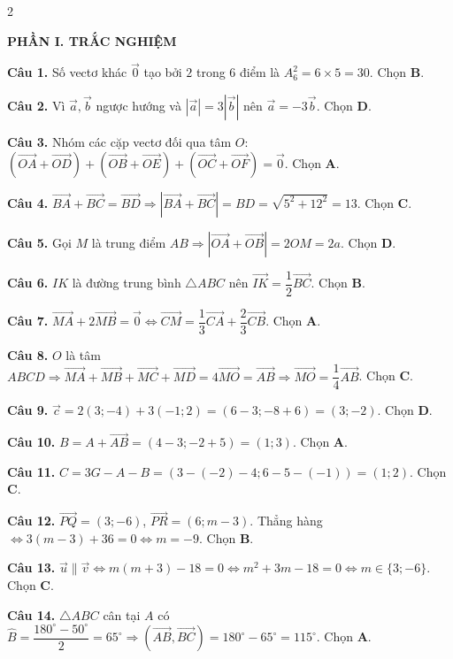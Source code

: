 \documentclass[10pt,a4paper]{article}
\begin{document}
\begin{multicols}{2}
\raggedcolumns
\small
{}

\textbf{\color{accent}\textsf{PHẦN I. TRẮC NGHIỆM}}

\textbf{Câu 1.} Số vectơ khác $\vec{0}$ tạo bởi $2$ trong $6$ điểm là $A_6^2 = 6 \times 5 = 30$. Chọn \textbf{B}.

\textbf{Câu 2.} Vì $\vec{a}, \vec{b}$ ngược hướng và $|\vec{a}| = 3|\vec{b}|$ nên $\vec{a} = -3\vec{b}$. Chọn \textbf{D}.

\textbf{Câu 3.} Nhóm các cặp vectơ đối qua tâm $O$: $(\vec{OA} + \vec{OD}) + (\vec{OB} + \vec{OE}) + (\vec{OC} + \vec{OF}) = \vec{0}$. Chọn \textbf{A}.

\textbf{Câu 4.} $\vec{BA} + \vec{BC} = \vec{BD} \Rightarrow |\vec{BA} + \vec{BC}| = BD = \sqrt{5^2 + 12^2} = 13$. Chọn \textbf{C}.

\textbf{Câu 5.} Gọi $M$ là trung điểm $AB \Rightarrow |\vec{OA} + \vec{OB}| = 2OM = 2a$. Chọn \textbf{D}.

\textbf{Câu 6.} $IK$ là đường trung bình $\triangle ABC$ nên $\vec{IK} = \dfrac{1}{2}\vec{BC}$. Chọn \textbf{B}.

\textbf{Câu 7.} $\vec{MA} + 2\vec{MB} = \vec{0} \Leftrightarrow \vec{CM} = \dfrac{1}{3}\vec{CA} + \dfrac{2}{3}\vec{CB}$. Chọn \textbf{A}.

\textbf{Câu 8.} $O$ là tâm $ABCD \Rightarrow \vec{MA} + \vec{MB} + \vec{MC} + \vec{MD} = 4\vec{MO} = \vec{AB} \Rightarrow \vec{MO} = \dfrac{1}{4}\vec{AB}$. Chọn \textbf{C}.

\textbf{Câu 9.} $\vec{c} = 2(3; -4) + 3(-1; 2) = (6 - 3; -8 + 6) = (3; -2)$. Chọn \textbf{D}.

\textbf{Câu 10.} $B = A + \vec{AB} = (4 - 3; -2 + 5) = (1; 3)$. Chọn \textbf{A}.

\textbf{Câu 11.} $C = 3G - A - B = (3 - (-2) - 4; 6 - 5 - (-1)) = (1; 2)$. Chọn \textbf{C}.

\textbf{Câu 12.} $\vec{PQ} = (3; -6)$, $\vec{PR} = (6; m - 3)$. Thẳng hàng $\Leftrightarrow 3(m - 3) + 36 = 0 \Leftrightarrow m = -9$. Chọn \textbf{B}.

\textbf{Câu 13.} $\vec{u} \parallel \vec{v} \Leftrightarrow m(m + 3) - 18 = 0 \Leftrightarrow m^2 + 3m - 18 = 0 \Leftrightarrow m \in \{3; -6\}$. Chọn \textbf{C}.

\textbf{Câu 14.} $\triangle ABC$ cân tại $A$ có $\widehat{B} = \dfrac{180^\circ - 50^\circ}{2} = 65^\circ \Rightarrow (\vec{AB}, \vec{BC}) = 180^\circ - 65^\circ = 115^\circ$. Chọn \textbf{A}.


\end{multicols}
\end{document}
